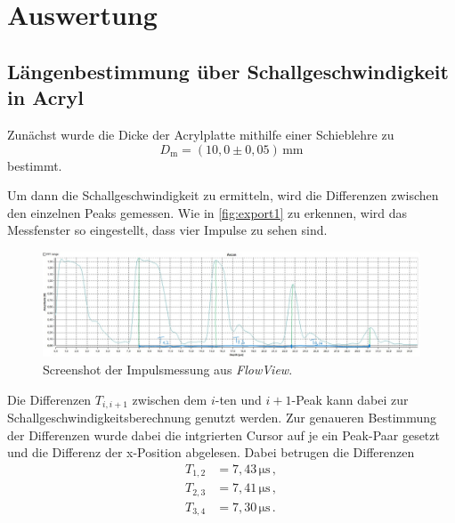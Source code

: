 \section{Auswertung}
\label{sec:auswertung}

\subsection{Längenbestimmung über Schallgeschwindigkeit in Acryl}
\label{subsec:längenbest}

Zunächst wurde die Dicke der Acrylplatte mithilfe einer Schieblehre zu
\begin{equation*}
    D_\text{m} = (10,0 \pm 0,05) \,\unit{\milli\meter}
\end{equation*}
bestimmt.

Um dann die Schallgeschwindigkeit zu ermitteln, wird die Differenzen zwischen den einzelnen Peaks gemessen.
Wie in \autoref{fig:export1} zu erkennen, wird das Messfenster so eingestellt, dass vier Impulse zu sehen sind.%

\begin{figure}
    \centering
    \includegraphics[width=\textwidth]{figures/MessungAcrylplatte(1).jpg}
    \caption{Screenshot der Impulsmessung aus \textit{FlowView}.}
    \label{fig:export1}
\end{figure}

Die Differenzen $T_{i,i+1}$ zwischen dem $i$-ten und $i + 1$-Peak kann dabei zur Schallgeschwindigkeitsberechnung genutzt werden. Zur genaueren Bestimmung %
der Differenzen wurde dabei die intgrierten Cursor auf je ein Peak-Paar gesetzt und die Differenz der x-Position abgelesen.
Dabei betrugen die Differenzen
\begin{align*}
    T_{1,2} &= 7,43 \,\unit{\micro\second} \,,\\
    T_{2,3} &= 7,41 \,\unit{\micro\second} \,,\\
    T_{3,4} &= 7,30 \,\unit{\micro\second} \,.\\
\end{align*} \\

